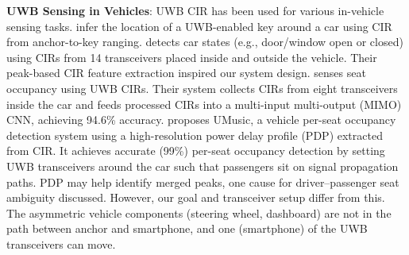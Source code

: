 \documentclass[sigconf]{acmart}
\begin{document}
\noindent
\textbf{UWB Sensing in Vehicles}:
UWB CIR has been used for various in-vehicle sensing tasks.
\cite{park2021locate} infer the location of a UWB-enabled key around a car using CIR from anchor-to-key ranging.
\cite{kalyanaraman2020caraokey} detects car states (e.g., door/window open or closed) using CIRs from 14 transceivers placed inside and outside the vehicle. Their peak-based CIR feature extraction inspired our system design.
\cite{ma2020carosense} senses seat occupancy using UWB CIRs. Their system collects CIRs from eight transceivers inside the car and feeds processed CIRs into a multi-input multi-output (MIMO) CNN, achieving 94.6\% accuracy.
\cite{UMusic} proposes UMusic, a vehicle per-seat occupancy detection system using a high-resolution power delay profile (PDP) extracted from CIR. It achieves accurate (99\%) per-seat occupancy detection by setting UWB transceivers around the car such that passengers sit on signal propagation paths. PDP may help identify merged peaks, one cause for driver–passenger seat ambiguity discussed. However, our goal and transceiver setup differ from this. The asymmetric vehicle components (steering wheel, dashboard) are not in the path between anchor and smartphone, and one (smartphone) of the UWB transceivers can move.
\end{document}
